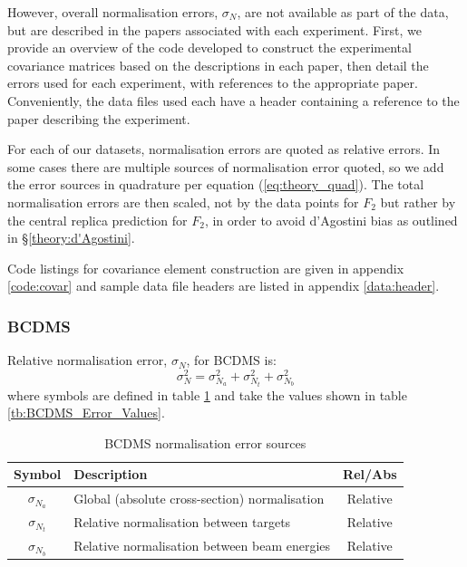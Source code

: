 \documentclass[12pt,a4paper]{report}
\begin{document}
However, overall normalisation errors, $\sigma_N$, are not available as part of the data, but are described in the papers associated with each experiment. First, we provide an overview of the code developed to construct the experimental covariance matrices based on the descriptions in each paper, then detail the errors used for each experiment, with references to the appropriate paper. Conveniently, the data files used each have a header containing a reference to the paper describing the experiment.

For each of our datasets, normalisation errors are quoted as relative errors. In some cases there are multiple sources of normalisation error quoted, so we add the error sources in quadrature per equation (\ref{eq:theory_quad}). The total normalisation errors are then scaled, not by the data points for $F_2$ but rather by the central replica prediction for $F_2$, in order to avoid d'Agostini bias as outlined in \S \ref{theory:d'Agostini}.

Code listings for covariance element construction are given in appendix \ref{code:covar} and sample data file headers are listed in appendix \ref{data:header}.

\subsubsection{BCDMS}

Relative normalisation error, $\sigma_N$, for BCDMS \cite[pg 486]{BCDMS:Proton} \cite[pg 594-5]{BCDMS:Deuteron} \cite[pg 5]{Forte:2002fg} is:
\begin{equation}
\sigma_N^2 = \sigma_{N_a}^2 + \sigma_{N_t}^2 + \sigma_{N_b}^2
\end{equation}
where symbols are defined in table \ref{tb:BCDMS_Error_Sources} and take the values shown in table \ref{tb:BCDMS_Error_Values}.

\begin{table}[h]
\begin{center}
\begin{tabular}{|c|p{8.5cm}|c|}
\hline
Symbol & Description & Rel/Abs\\
\hline
$\sigma_{N_a}$ & Global (absolute cross-section) normalisation & Relative\\
$\sigma_{N_t}$ & Relative normalisation between targets & Relative\\
$\sigma_{N_b}$ & Relative normalisation between beam energies & Relative\\
\hline
\end{tabular}
\caption{BCDMS normalisation error sources}
\label{tb:BCDMS_Error_Sources}
\end{center}
\end{table}
\end{document}
